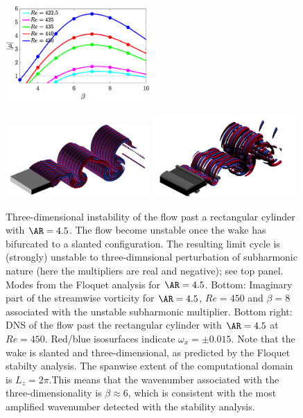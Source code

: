 \documentclass[onecolumn,notitlepage,superscriptaddress, amsmath,amssymb,longbibliographyaps,floatfix]{revtex4-1}
\begin{document}
\begin{figure}
\centering
\includegraphics[width=0.49\textwidth]{./fig/AR4p5/multipliers_3D.eps}
\vspace{0.1cm}
\vspace{0.1cm}
\includegraphics[trim={0 0 0 0},clip,width=0.49\textwidth]{./fig/AR4p5/Floqetmode_beta_8_Re450_AR4p5.png}
\includegraphics[width=0.49\textwidth]{./fig/AR4p5/lambda2_omegax-3D-Re450b.png}
\caption{Three-dimensional instability of the flow past a rectangular cylinder with $\AR=4.5$. The flow become unstable once the wake has bifurcated to a slanted configuration. The resulting limit cycle is (strongly) unstable to three-dimnsional perturbation of subharmonic nature (here the multipliers are real and negative); see top panel. Modes from the Floquet analysis for $\AR=4.5$. Bottom: Imaginary part of the streamwise vorticity for $\AR=4.5$, $Re=450$ and $\beta=8$ associated with the unstable subharmonic multiplier. Bottom right: DNS of the flow past the rectangular cylinder with $\AR=4.5$ at $Re=450$. Red/blue isosurfaces indicate $\omega_x = \pm 0.015$. Note that the wake is slanted and three-dimensional, as predicted by the Floquet stabilty analysis. The spanwise extent of the computational domain is $L_z=2\pi$.This means that the wavenumber associated with the three-dimensionality is $\beta \approx 6$, which is consistent with the most amplified wavenumber detected with the stability analysis.}
\label{fig:AR4p5_modes_Re430_beta0}
\end{figure}
\end{document}

